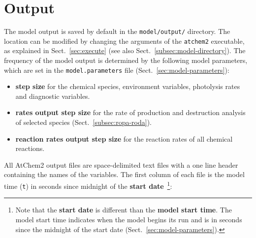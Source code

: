 \section{Output} \label{sec:output}

The model output is saved by default in the \texttt{model/output/}
directory. The location can be modified by changing the arguments of
the \texttt{atchem2} executable, as explained in Sect.~\ref{sec:execute}
(see also Sect.~\ref{subsec:model-directory}). The frequency of the model
output is determined by the following model parameters, which are set
in the \texttt{model.parameters} file (Sect.~\ref{sec:model-parameters}):

\begin{itemize}
\item \textbf{step size} for the chemical species, environment
  variables, photolysis rates and diagnostic variables.
\item \textbf{rates output step size} for the rate of production and
  destruction analysis of selected species (Sect.~\ref{subsec:ropa-roda}).
\item \textbf{reaction rates output step size} for the reaction rates
  of all chemical reactions.
\end{itemize}

All AtChem2 output files are space-delimited text files with a one
line header containing the names of the variables. The first column of
each file is the model time (\texttt{t}) in seconds since midnight of
the \textbf{start date}~\footnote{Note that the \textbf{start date} is
  different than the \textbf{model start time}. The model start time
  indicates when the model begins its run and is in seconds since the
  midnight of the start date (Sect.~\ref{sec:model-parameters}).}:

